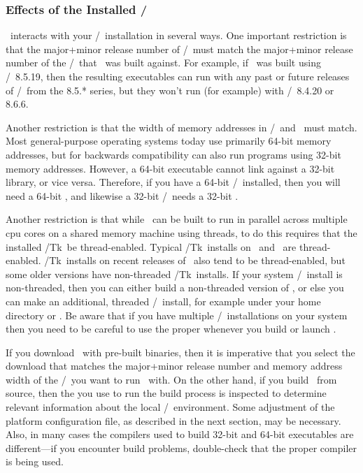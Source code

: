 \subsubsection{Effects of the Installed \Tcl/\Tk}
\OOMMF\ interacts with your \Tcl/\Tk\ installation in several ways.  One
important restriction is that the major+minor release number of
\Tcl/\Tk\ must match the major+minor release number of the \Tcl/\Tk\
that \OOMMF\ was built against.  For example, if \OOMMF\ was built using
\Tcl/\Tk\ 8.5.19, then the resulting executables can run with any past or
future releases of \Tcl/\Tk\ from the 8.5.* series, but they won't run
(for example) with \Tcl/\Tk\ 8.4.20 or 8.6.6.

Another restriction is that the width of memory addresses in \Tcl/\Tk\
and \OOMMF\ must match.  Most general-purpose operating systems today
use primarily 64-bit memory addresses, but for backwards compatibility
can also run programs using 32-bit memory addresses.  However, a 64-bit
executable cannot link against a 32-bit library, or vice versa.
Therefore, if you have a 64-bit \Tcl/\Tk\ installed, then you will need
a 64-bit \OOMMF, and likewise a 32-bit \Tcl/\Tk\ needs a 32-bit \OOMMF.

Another restriction is that while \OOMMF\ can be built to run in
parallel across multiple cpu cores on a shared memory machine using
threads, to do this requires that the installed \Tcl/Tk\ be
thread-enabled.  Typical \Tcl/Tk\ installs on \Windows\ and \MacOSX\ are
thread-enabled.  \Tcl/Tk\ installs on recent releases of \Unix\ also
tend to be thread-enabled, but some older versions have non-threaded
\Tcl/Tk\ installs.  If your system \Tcl/\Tk\ install is non-threaded,
then you can either build a non-threaded version of \OOMMF, or else you
can make an additional, threaded \Tcl/\Tk\ install, for example under
your home directory or \fn{/usr/local}.  Be aware that if you have
multiple \Tcl/\Tk\ installations on your system then you need to be
careful to use the proper \fn{tclsh} whenever you build or launch
\OOMMF.

If you download \OOMMF\ with pre-built binaries, then it is imperative
that you select the download that matches the major+minor release
number and memory address width of the \Tcl/\Tk\ you want to run
\OOMMF\ with.  On the other hand, if you build \OOMMF\ from source,
then the \fn{tclsh} you use to run the build process is inspected to
determine relevant information about the local \Tcl/\Tk\ environment.
Some adjustment of the platform
configuration file, as described in the next section, may be
necessary.  Also, in many cases the compilers used to build 32-bit and
64-bit executables are different---if you encounter build problems,
double-check that the proper compiler is being used.

